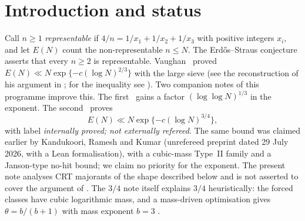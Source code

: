 \documentclass[10pt,reqno]{amsart}
\theoremstyle{definition}
\theoremstyle{remark}
\begin{document}
\begin{abstract}
that is exact for this route, and show that its fixed-margin form is false.  For
super-polynomial large-sieve frequencies we show that any cap needs
family-specific input, such as the sparsity of forced classes; using
sparsity through a smooth--rough splitting, every CRT-admissible large
sieve, at any frequency level, saves at most
$O((\log N)^{3/4}(\log\log N)^3)$ for mixtures with at most one prime factor
above $\exp\{(\log N)^{1/4}\}$ per modulus, and at most
$O_\gamma((\log N)^{3/4}(\log\log N)^3)$ whenever the residues of the classes with
several such primes are $\gamma$-sparse at each such prime ($\gamma>0$ fixed), which
includes the residue-concentrated families; the remaining mixtures are
reduced to a sup-decay hypothesis.  We also show
that the literal tuple-count hypothesis meets forced zeros above $2/3$ and
give the repaired alternating form.  We list exactly what the theorems
exclude.  Finally we explain the cap and the pointwise ceiling $1/4$ for
the least witness modulus of a prime as two readings of one sieve limit,
and record the $3/4$ bound for primes in $\pi(N)$ form.  Every statement
carries its status label.  All proofs were
checked internally only; nothing here has been externally refereed.  This
is not a proof of the Erd\H{o}s--Straus conjecture.
\end{abstract}
\maketitle

\section{Introduction and status}\label{sec:intro}

Call $n\geq1$ \emph{representable} if $4/n=1/x_1+1/x_2+1/x_3$ with
positive integers $x_i$, and let $E(N)$ count the non-representable
$n\leq N$.  The Erd\H{o}s--Straus conjecture asserts that every $n\geq2$ is
representable.  Vaughan~\cite{Vaughan} proved
$E(N)\ll N\exp\{-c(\log N)^{2/3}\}$ with the large sieve (see the
reconstruction of his argument in \cite[\S4]{PW}; for the inequality see
\cite{Montgomery}).  Two companion notes of this programme
improve this.  The first~\cite{LL} gains a factor
$(\log\log N)^{1/3}$ in the exponent.  The second~\cite{TQ} proves
\[
 E(N)\ll N\exp\{-c(\log N)^{3/4}\},
\]
with label \emph{internally proved; not externally refereed}.  The same
bound was claimed earlier by Kandukoori, Ramesh and Kumar \cite{KRK}
(unrefereed preprint dated 29 July 2026, with a Lean formalisation), with a
cubic-mass Type~II family and a Janson-type no-hit bound; we claim no
priority for the exponent.  The present note analyses CRT majorants of the
shape described below and is not asserted to cover the argument of
\cite{KRK}.  The $3/4$
note itself explains $3/4$ heuristically: the forced classes have
cubic logarithmic mass, and a mass-driven optimisation gives
$\theta=b/(b+1)$ with mass exponent $b=3$ \cite[\S10]{TQ}.
\end{document}

